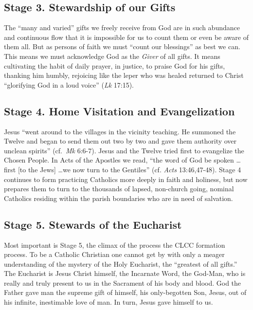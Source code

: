\documentclass{article}
\begin{document}

\subsection{Stage 3. Stewardship of our Gifts}

The ``many and varied'' gifts we freely receive from God are in such abundance
and continuous flow that it is impossible for us to count them or even be aware
of them all. But as persons of faith we must ``count our blessings'' as best we
can. This means we must acknowledge God as the \emph{Giver} of all gifts. It
means cultivating the habit of daily prayer, in justice, to praise God for his
gifts, thanking him humbly, rejoicing like the leper who was healed returned to
Christ ``glorifying God in a loud voice'' (\emph{Lk} 17:15).


\subsection{Stage 4. Home Visitation and Evangelization}

Jesus ``went around to the villages in the vicinity teaching. He summoned the
Twelve and began to send them out two by two and gave them authority over
unclean spirits'' (cf.\ \emph{Mk} 6:6-7). Jesus and the Twelve tried first to
evangelize the Chosen People. In Acts of the Apostles we read, ``the word of God
be spoken \ldots first [to the Jews] \ldots we now turn to the Gentiles''
(cf. \emph{Acts} 13:46,47-48). Stage 4 continues to form practicing Catholics
more deeply in faith and holiness, but now prepares them to turn to the
thousands of lapsed, non-church going, nominal Catholics residing within the
parish boundaries who are in need of salvation.


\subsection{Stage 5. Stewards of the Eucharist}

Most important is Stage 5, the climax of the process the CLCC formation
process. To be a Catholic Christian one cannot get by with only a meager
understanding of the mystery of the Holy Eucharist, the ``greatest of all
gifts.'' The Eucharist is Jesus Christ himself, the Incarnate Word, the God-Man,
who is really and truly present to us in the Sacrament of his body and
blood. God the Father gave man the supreme gift of himself, his only-begotten
Son, Jesus, out of his infinite, inestimable love of man. In turn, Jesus gave
himself to us.
\end{document}
